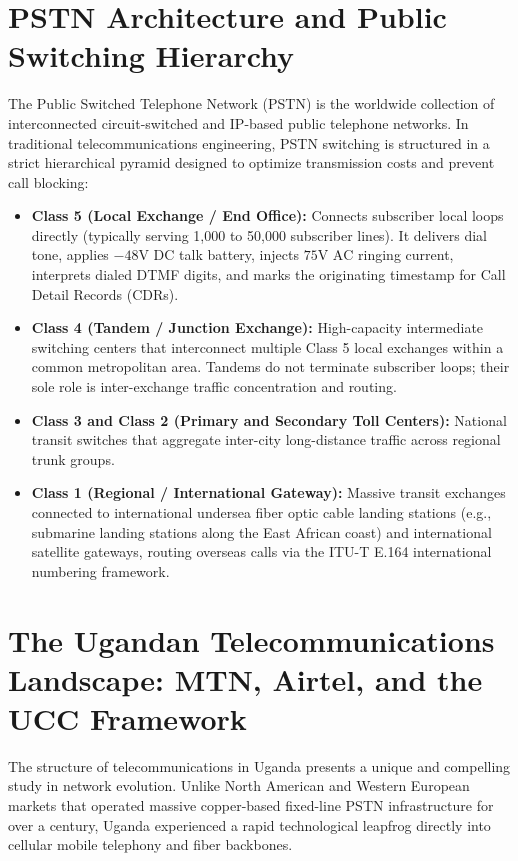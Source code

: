 \documentclass[12pt,a4paper]{report}
\begin{document}
\section{PSTN Architecture and Public Switching Hierarchy}
The Public Switched Telephone Network (PSTN) is the worldwide collection of interconnected circuit-switched and IP-based public telephone networks. In traditional telecommunications engineering, PSTN switching is structured in a strict hierarchical pyramid designed to optimize transmission costs and prevent call blocking:
\begin{itemize}
    \item \textbf{Class 5 (Local Exchange / End Office):} Connects subscriber local loops directly (typically serving 1,000 to 50,000 subscriber lines). It delivers dial tone, applies $-48\text{V DC}$ talk battery, injects $75\text{V AC}$ ringing current, interprets dialed DTMF digits, and marks the originating timestamp for Call Detail Records (CDRs).
    \item \textbf{Class 4 (Tandem / Junction Exchange):} High-capacity intermediate switching centers that interconnect multiple Class 5 local exchanges within a common metropolitan area. Tandems do not terminate subscriber loops; their sole role is inter-exchange traffic concentration and routing.
    \item \textbf{Class 3 and Class 2 (Primary and Secondary Toll Centers):} National transit switches that aggregate inter-city long-distance traffic across regional trunk groups.
    \item \textbf{Class 1 (Regional / International Gateway):} Massive transit exchanges connected to international undersea fiber optic cable landing stations (e.g., submarine landing stations along the East African coast) and international satellite gateways, routing overseas calls via the ITU-T E.164 international numbering framework.
\end{itemize}

\section{The Ugandan Telecommunications Landscape: MTN, Airtel, and the UCC Framework}
The structure of telecommunications in Uganda presents a unique and compelling study in network evolution. Unlike North American and Western European markets that operated massive copper-based fixed-line PSTN infrastructure for over a century, Uganda experienced a rapid technological leapfrog directly into cellular mobile telephony and fiber backbones.
\end{document}
